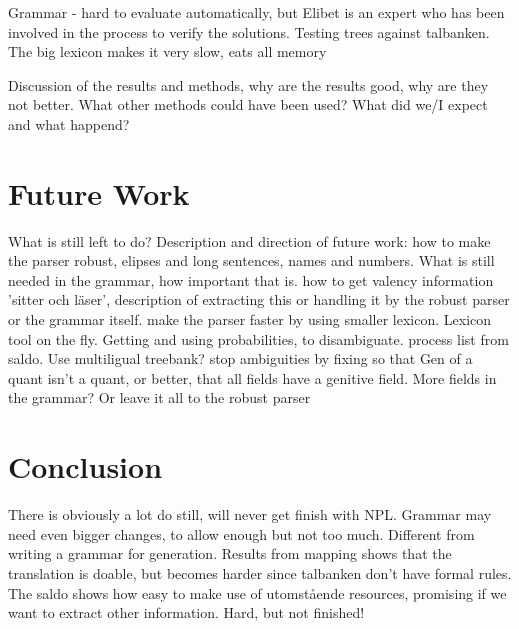 \documentclass{report}
\begin{document}
Grammar - hard to evaluate automatically, but Elibet is an expert who has been involved
in the process to verify the solutions. Testing trees against talbanken.
The big lexicon makes it very slow, eats all memory

Discussion of the results and methods, why are the results good, why are they not better.
What other methods could have been used? What did we/I expect and what happend?


\section{Future Work}
What is still left to do? Description and direction of future work:
how to make the parser robust, elipses and long sentences, names and numbers.
What is still needed in the grammar, how important that is. 
how to get valency information 'sitter och läser', description of extracting this
or handling it by the robust parser or the grammar itself.
make the parser faster by using smaller lexicon.
Lexicon tool on the fly.
Getting and using probabilities, to disambiguate.
process list from saldo.
Use multiligual treebank?
stop ambiguities by fixing so that Gen of a quant isn't a quant, or better, that all fields
have a genitive field.
More fields in the grammar? Or leave it all to the robust parser


\section{Conclusion}
There is obviously a lot do still, will never get finish with NPL.
Grammar may need even bigger changes, to allow enough but not too much.
Different from writing a grammar for generation.
Results from mapping shows that the translation is doable, but becomes harder
since talbanken don't have formal rules.
The saldo shows how easy to make use of utomstående resources, promising if
we want to extract other information. 
Hard, but not finished! 
\end{document}
